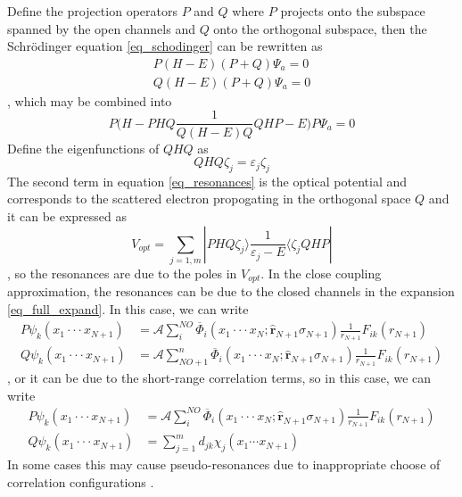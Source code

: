 Define the projection operators $P$ and $Q$ where $P$ projects onto the subspace spanned by the open channels and $Q$ onto the orthogonal subspace, then the Schr\"odinger equation \ref{eq_schodinger} can be rewritten as
\begin{align}
	P(H-E)(P+Q) \Psi_a = 0 \\
	Q(H-E)(P+Q) \Psi_a = 0
\end{align}
, which may be combined into
\begin{equation} \label{eq_resonances}
	P\Bigg(H-PHQ\frac{1}{Q(H-E)Q}QHP-E\Bigg)P\Psi_a = 0
\end{equation}
Define the eigenfunctions of $QHQ$ as 
\begin{equation}
	QHQ\zeta_j = \varepsilon_j\zeta_j
\end{equation}
The second term in equation \ref{eq_resonances} is the optical potential and corresponds to the scattered electron propogating in the orthogonal space $Q$ and it can be expressed as
\begin{equation}
	V_{opt} = \sum_{j=1,m}|PHQ\zeta_j\rangle\frac{1}{\varepsilon_j-E}\langle\zeta_jQHP|
\end{equation}
, so the resonances are due to the poles in $V_{opt}$. 
In the close coupling approximation, the resonances can be due to the closed channels in the expansion \ref{eq_full_expand}. In this case, we can write
\begin{align}
	P\psi_k(x_1\cdot\cdot\cdot x_{N+1}) &= \mathcal{A}\sum_{i}^{NO}\overline{\Phi}_i(x_1\cdot\cdot\cdot x_{N}; \hat{\textbf{r}}_{N+1}\sigma_{N+1}) \frac{1}{r_{N+1}} F_{ik}(r_{N+1}) \\
	Q\psi_k(x_1\cdot\cdot\cdot x_{N+1}) &= \mathcal{A}\sum_{NO+1}^{n}\overline{\Phi}_i(x_1\cdot\cdot\cdot x_{N}; \hat{\textbf{r}}_{N+1}\sigma_{N+1}) \frac{1}{r_{N+1}} F_{ik}(r_{N+1})
\end{align}
, or it can be due to the short-range correlation terms, so in this case, we can write
\begin{align}
	P\psi_k(x_1\cdot\cdot\cdot x_{N+1}) &= \mathcal{A}\sum_{i}^{NO}\overline{\Phi}_i(x_1\cdot\cdot\cdot x_{N}; \hat{\textbf{r}}_{N+1}\sigma_{N+1}) \frac{1}{r_{N+1}} F_{ik}(r_{N+1}) \\
	Q\psi_k(x_1\cdot\cdot\cdot x_{N+1}) &= \sum_{j=1}^m d_{jk} \chi_j(x_1\cdots x_{N+1}) 
\end{align}
In some cases this may cause pseudo-resonances due to inappropriate choose of correlation configurations \citep{pseudo_reso_1, pseudo_reso_2}.

